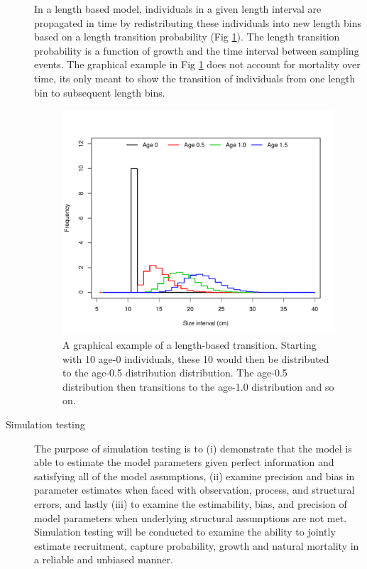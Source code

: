 \begin{description}
	In a length based model, individuals in a given length interval are propagated in time by redistributing these individuals into new length bins based on a length transition probability (Fig \ref{fig:lengthTransition}).  The length transition probability is a function of growth and the time interval between sampling events.  The graphical example in Fig \ref{fig:lengthTransition} does not account for mortality over time, its only meant to show the transition of individuals from one length bin to subsequent length bins.
	\begin{figure}[htbp]
		\centering
			\includegraphics[scale=0.65]{../FIGS/fig:lengthTransition}
		\caption{A graphical example of a length-based transition. Starting with 10 age-0 individuals, these 10 would then be distributed to the age-0.5 distribution distribution.  The age-0.5 distribution then transitions to the age-1.0 distribution and so on.}
		\label{fig:lengthTransition}
	\end{figure}
	
	\item[Simulation testing] The purpose of simulation testing is to (i) demonstrate that the model is able to estimate the model parameters given perfect information and satisfying all of the model assumptions, (ii) examine precision and bias in parameter estimates when faced with observation, process, and structural errors, and lastly (iii) to examine the estimability, bias, and precision of model parameters when underlying structural assumptions are not met.  Simulation testing will be conducted to examine the ability to jointly estimate recruitment, capture probability, growth and natural mortality in a reliable and unbiased manner.
	

\end{description}
